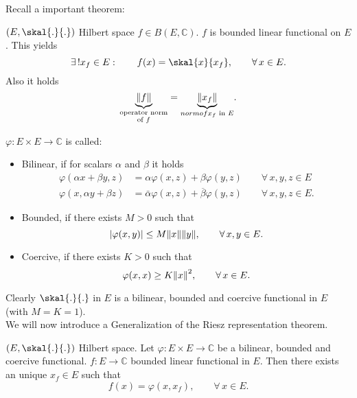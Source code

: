 Recall a important theorem:

\begin{theorem}
	$(E, \skal{.}{.})$ Hilbert space $f \in B(E,\mathbb{C})$. $f$ is bounded linear functional on $E$. This yields
	\[
		\exists\,! x_f \in E: \qquad f(x) = \skal{x}{x_f}, \qquad \forall\, x \in E.
	\]
	Also it holds
	\[
		\underset{\substack{\text{operator norm} \\ \text{of $f$}}}{\underbrace{\norm{f}}} = \underset{\substack{norm of} \\ \text{$x_f$ in $E$}}{\underbrace{\norm{x_f}}}.
	\]
\end{theorem}

\begin{definition}
	$\varphi: E \times E \to \mathbb{C}$ is called:
	\begin{itemize}
		\item Bilinear, if for scalars $\alpha$ and $\beta$ it holds
		\begin{align*}
			\varphi( \alpha x+ \beta y,z) &= \alpha \varphi(x,z)+ \beta \varphi(y,z) \qquad \forall\, x,y,z \in E \\
			\varphi(x,\alpha y + \beta z) &= \bar{\alpha} \varphi(x,z) + \overline{\beta} \varphi(y,z) \qquad \forall\, x,y,z \in E.
		\end{align*}
		\item Bounded, if there exists $M>0$ such that
		\[
			\abs{\varphi(x,y)} \leq M \norm{x}\norm{y}, \qquad \forall\, x,y \in E.
		\]
		\item Coercive, if there exists $K>0$ such that
		\[
			\varphi(x,x) \geq K \norm{x}^2, \qquad \forall\, x \in E.
		\]
	\end{itemize}
\end{definition}
Clearly $\skal{.}{.}$ in $E$ is a bilinear, bounded and coercive functional in $E$ (with $M=K=1$). \\
We will now introduce a Generalization of the Riesz representation theorem.

\begin{theorem}
	$(E, \skal{.}{.})$ Hilbert space. Let $\varphi: E \times E \to \mathbb{C}$ be a bilinear, bounded and coercive functional. $f: E \to \mathbb{C}$ bounded linear functional in $E$. Then there exists an unique $x_f \in E$ such that
	\[
		f(x) = \varphi(x,x_f), \qquad  \forall\, x \in E.
	\]
\end{theorem}

